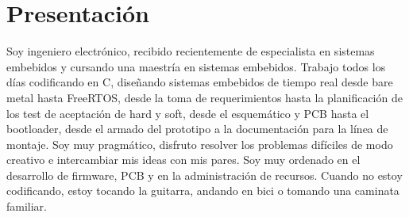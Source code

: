 \section{Presentación}
Soy ingeniero electrónico, recibido recientemente de especialista en sistemas
embebidos y cursando una maestría en sistemas embebidos. Trabajo todos los días
codificando en C, diseñando sistemas embebidos de tiempo real desde bare metal
hasta FreeRTOS, desde la toma de requerimientos hasta la planificación de los
test de aceptación de hard y soft, desde el esquemático y PCB hasta el
bootloader, desde el armado del prototipo a la documentación para la línea de
montaje.  Soy muy pragmático, disfruto resolver los problemas difíciles de modo
creativo e intercambiar mis ideas con mis pares. Soy muy ordenado en
el desarrollo de firmware, PCB y en la administración de recursos.  Cuando no
estoy codificando, estoy tocando la guitarra, andando en bici o tomando una
caminata familiar.
